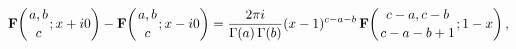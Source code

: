\[\mathop{\mathbf{F}\/}\nolimits\!\left({a,b\atop c};x+i0\right)-\mathop{\mathbf%
{F}\/}\nolimits\!\left({a,b\atop c};x-i0\right)=\frac{2\pi i}{\mathop{\Gamma\/%
}\nolimits\!\left(a\right)\mathop{\Gamma\/}\nolimits\!\left(b\right)}(x-1)^{c-%
a-b}\mathop{\mathbf{F}\/}\nolimits\!\left({c-a,c-b\atop c-a-b+1};1-x\right),\]